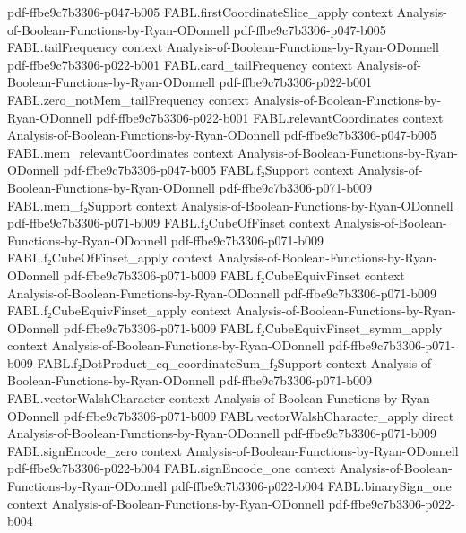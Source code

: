 \begin{theorem}
  {pdf-ffbe9c7b3306-p047-b005}
\proofstep
  {FABL.firstCoordinateSlice_apply}
  {context}
  {Analysis-of-Boolean-Functions-by-Ryan-ODonnell}
  {pdf-ffbe9c7b3306-p047-b005}
\proofstep
  {FABL.tailFrequency}
  {context}
  {Analysis-of-Boolean-Functions-by-Ryan-ODonnell}
  {pdf-ffbe9c7b3306-p022-b001}
\proofstep
  {FABL.card_tailFrequency}
  {context}
  {Analysis-of-Boolean-Functions-by-Ryan-ODonnell}
  {pdf-ffbe9c7b3306-p022-b001}
\proofstep
  {FABL.zero_notMem_tailFrequency}
  {context}
  {Analysis-of-Boolean-Functions-by-Ryan-ODonnell}
  {pdf-ffbe9c7b3306-p022-b001}
\proofstep
  {FABL.relevantCoordinates}
  {context}
  {Analysis-of-Boolean-Functions-by-Ryan-ODonnell}
  {pdf-ffbe9c7b3306-p047-b005}
\proofstep
  {FABL.mem_relevantCoordinates}
  {context}
  {Analysis-of-Boolean-Functions-by-Ryan-ODonnell}
  {pdf-ffbe9c7b3306-p047-b005}
\proofstep
  {FABL.f₂Support}
  {context}
  {Analysis-of-Boolean-Functions-by-Ryan-ODonnell}
  {pdf-ffbe9c7b3306-p071-b009}
\proofstep
  {FABL.mem_f₂Support}
  {context}
  {Analysis-of-Boolean-Functions-by-Ryan-ODonnell}
  {pdf-ffbe9c7b3306-p071-b009}
\proofstep
  {FABL.f₂CubeOfFinset}
  {context}
  {Analysis-of-Boolean-Functions-by-Ryan-ODonnell}
  {pdf-ffbe9c7b3306-p071-b009}
\proofstep
  {FABL.f₂CubeOfFinset_apply}
  {context}
  {Analysis-of-Boolean-Functions-by-Ryan-ODonnell}
  {pdf-ffbe9c7b3306-p071-b009}
\proofstep
  {FABL.f₂CubeEquivFinset}
  {context}
  {Analysis-of-Boolean-Functions-by-Ryan-ODonnell}
  {pdf-ffbe9c7b3306-p071-b009}
\proofstep
  {FABL.f₂CubeEquivFinset_apply}
  {context}
  {Analysis-of-Boolean-Functions-by-Ryan-ODonnell}
  {pdf-ffbe9c7b3306-p071-b009}
\proofstep
  {FABL.f₂CubeEquivFinset_symm_apply}
  {context}
  {Analysis-of-Boolean-Functions-by-Ryan-ODonnell}
  {pdf-ffbe9c7b3306-p071-b009}
\proofstep
  {FABL.f₂DotProduct_eq_coordinateSum_f₂Support}
  {context}
  {Analysis-of-Boolean-Functions-by-Ryan-ODonnell}
  {pdf-ffbe9c7b3306-p071-b009}
\proofstep
  {FABL.vectorWalshCharacter}
  {context}
  {Analysis-of-Boolean-Functions-by-Ryan-ODonnell}
  {pdf-ffbe9c7b3306-p071-b009}
\proofstep
  {FABL.vectorWalshCharacter_apply}
  {direct}
  {Analysis-of-Boolean-Functions-by-Ryan-ODonnell}
  {pdf-ffbe9c7b3306-p071-b009}
\proofstep
  {FABL.signEncode_zero}
  {context}
  {Analysis-of-Boolean-Functions-by-Ryan-ODonnell}
  {pdf-ffbe9c7b3306-p022-b004}
\proofstep
  {FABL.signEncode_one}
  {context}
  {Analysis-of-Boolean-Functions-by-Ryan-ODonnell}
  {pdf-ffbe9c7b3306-p022-b004}
\proofstep
  {FABL.binarySign_one}
  {context}
  {Analysis-of-Boolean-Functions-by-Ryan-ODonnell}
  {pdf-ffbe9c7b3306-p022-b004}
\proofstep

\end{theorem}
